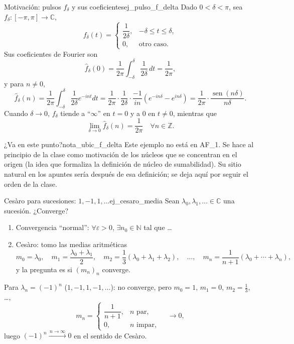 \begin{ejemplo}{Motivación: pulsos $f_\delta$ y sus coeficientes}{ej_pulso_f_delta}
Dado $0 < \delta < \pi$, sea $f_\delta : [-\pi,\pi] \to \mathbb{C}$,
\[
f_\delta(t) = \begin{cases} \dfrac{1}{2\delta}, & -\delta \le t \le \delta, \\[1ex] 0, & \text{otro caso.} \end{cases}
\]
Sus coeficientes de Fourier son
\[
\hat{f}_\delta(0) = \frac{1}{2\pi} \int_{-\delta}^{\delta} \frac{1}{2\delta} \, dt = \frac{1}{2\pi},
\]
y para $n \ne 0$,
\[
\hat{f}_\delta(n) = \frac{1}{2\pi} \int_{-\delta}^{\delta} \frac{1}{2\delta} e^{-int} dt = \frac{1}{2\pi} \cdot \frac{1}{2\delta} \cdot \frac{-1}{in} \left( e^{-in\delta} - e^{in\delta} \right) = \frac{1}{2\pi} \cdot \frac{\operatorname{sen}(n\delta)}{n\delta}.
\]
Cuando $\delta \to 0$, $f_\delta$ tiende a ``$\infty$'' en $t=0$ y a $0$ en $t \ne 0$, mientras que
\[
\lim_{\delta \to 0} \hat{f}_\delta(n) = \frac{1}{2\pi} \quad \forall n \in \mathbb{Z}.
\]
\end{ejemplo}

\begin{nota}{¿Va en este punto?}{nota_ubic_f_delta}
Este ejemplo no está en AF\_1. Se hace al principio de la clase como motivación de los núcleos que se concentran en el origen (la idea que formaliza la definición de núcleo de sumabilidad). Su sitio natural en los apuntes sería después de esa definición; se deja aquí por seguir el orden de la clase.
\end{nota}

\begin{ejemplo}{Cesàro para sucesiones: $1,-1,1,\dots$}{ej_cesaro_media}
Sean $\lambda_0, \lambda_1, \ldots \in \mathbb{C}$ una sucesión. ¿Converge?

\begin{enumerate}
\item[(a)] Convergencia ``normal'': $\forall \varepsilon > 0$, $\exists n_0 \in \mathbb{N}$ tal que \dots
\item[(b)] Cesàro: tomo las medias aritméticas
\[
m_0 = \lambda_0, \quad m_1 = \frac{\lambda_0 + \lambda_1}{2}, \quad m_2 = \frac{1}{3}(\lambda_0 + \lambda_1 + \lambda_2), \quad \dots, \quad m_n = \frac{1}{n+1}(\lambda_0 + \cdots + \lambda_n),
\]
y la pregunta es si $(m_n)_n$ converge.
\end{enumerate}

Para $\lambda_n = (-1)^n$ ($1,-1,1,-1,\dots$): no converge, pero $m_0 = 1$, $m_1 = 0$, $m_2 = \tfrac{1}{3}$, \dots,
\[
m_n = \begin{cases} \dfrac{1}{n+1}, & n \text{ par}, \\[1ex] 0, & n \text{ impar}, \end{cases} \quad \longrightarrow 0,
\]
luego $(-1)^n \xrightarrow{\,n\to\infty\,} 0$ en el sentido de Cesàro.
\end{ejemplo}


